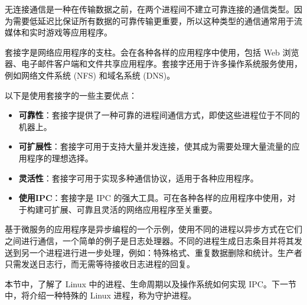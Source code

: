 \begin{itemize}
无连接通信是一种在传输数据之前，在两个进程间不建立可靠连接的通信类型。因为需要低延迟比保证所有数据的可靠传输更重要，所以这种类型的通信通常用于流媒体和实时游戏等应用程序。

套接字是网络应用程序的支柱。会在各种各样的应用程序中使用，包括 Web 浏览器、电子邮件客户端和文件共享应用程序。套接字还用于许多操作系统服务使用，例如网络文件系统 (NFS) 和域名系统 (DNS)。

以下是使用套接字的一些主要优点：

\begin{itemize}
\item
\textbf{可靠性}：套接字提供了一种可靠的进程间通信方式，即使这些进程位于不同的机器上。

\item
\textbf{可扩展性}：套接字可用于支持大量并发连接，使其成为需要处理大量流量的应用程序的理想选择。

\item
\textbf{灵活性}：套接字可用于实现多种通信协议，适用于各种应用程序。

\item
\textbf{使用IPC}：套接字是 IPC 的强大工具。可在各种各样的应用程序中使用，对于构建可扩展、可靠且灵活的网络应用程序至关重要。
\end{itemize}

\end{itemize}

基于微服务的应用程序是异步编程的一个示例，使用不同的进程以异步方式在它们之间进行通信，一个简单的例子是日志处理器。不同的进程生成日志条目并将其发送到另一个进程进行进一步处理，例如：特殊格式、重复数据删除和统计。生产者只需发送日志行，而无需等待接收日志进程的回复。

本节中，了解了 Linux 中的进程、生命周期以及操作系统如何实现 IPC。下一节中，将介绍一种特殊的 Linux 进程，称为守护进程。































